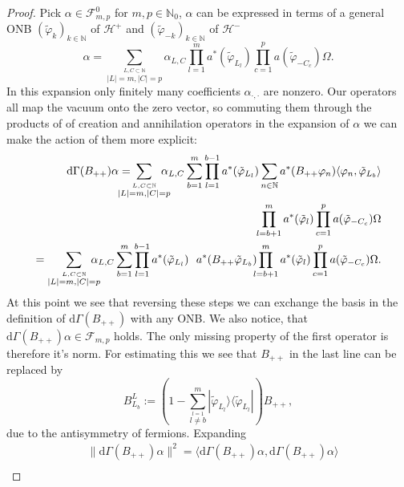 \documentclass[b5paper,draft,openbib,12pt]{memoir}
\begin{document}
\begin{proof}
Pick \(\alpha\in\mathcal{F}^0_{m,p}\) for \(m,p\in\mathbb{N}_0\), \(\alpha\) can be expressed in terms of a general ONB 
\((\tilde{\varphi}_k)_{k\in\mathbb{N}}\) of \(\mathcal{H}^+\) and \((\tilde{\varphi}_{-k})_{k\in\mathbb{N}}\) of \(\mathcal{H}^-\)
\begin{equation}
\alpha=\sum_{\overset{L,C\subset \mathbb{N}}{|L|=m,|C|=p}}\!\!\!\!\!\!\alpha_{L,C} \prod_{l=1}^m a^*(\tilde{\varphi}_{L_l}) \prod_{c=1}^p a(\tilde{\varphi}_{-C_c}) \Omega.
\end{equation}
In this expansion only finitely many coefficients \(\alpha_{\cdot, \cdot}\) are nonzero. Our operators all map the vacuum onto the zero vector, so commuting them 
through the products of of creation and annihilation operators in the expansion of \(\alpha\) we can make the action of them more explicit:
\begin{align}\nonumber
\mathrm{d}\Gamma(B_{++}) \alpha =\hspace{-0.5cm} \sum_{\overset{L,C\subset \mathbb{N}}{|L|=m,|C|=p}}\!\!\!\!\!\!\alpha_{L,C} \sum_{b=1}^m 
\prod_{l=1}^{b-1} a^*(\tilde{\varphi}_{L_l})  \sum_{n\in\mathbb{N}} a^*(B_{++}\varphi_n) \langle \varphi_n, \tilde{\varphi}_{L_b}\rangle \\
\prod_{l=b+1}^m a^*(\tilde{\varphi}_{l}) \prod_{c=1}^p a(\tilde{\varphi}_{-C_c}) \Omega\\
=\sum_{\overset{L,C\subset \mathbb{N}}{|L|=m,|C|=p}}\!\!\!\!\!\!\alpha_{L,C} \sum_{b=1}^m 
\prod_{l=1}^{b-1} a^*(\tilde{\varphi}_{L_l})  ~~ a^*(B_{++} \tilde{\varphi}_{L_b})  \!\!\!
\prod_{l=b+1}^m a^*(\tilde{\varphi}_{l}) \prod_{c=1}^p a(\tilde{\varphi}_{-C_c}) \Omega.
\end{align}
At this point we see that reversing these steps we can exchange the basis in the definition of \(\mathrm{d}\Gamma(B_{++})\) with any ONB.
We also notice, that \(\mathrm{d}\Gamma(B_{++})\alpha \in \mathcal{F}_{m,p}\) holds. The only missing property of the first operator is therefore
it's norm. For estimating this we see that \(B_{++}\) in the last line can be replaced by 
\begin{equation}
B^L_{L_b}:=\left(1-\sum_{\overset{l=1}{l\neq b}}^m |\tilde{\varphi}_{L_l}\rangle \langle \tilde{\varphi}_{L_l}|\right) B_{++},
\end{equation}
due to the antisymmetry of fermions. Expanding 
\begin{align}\nonumber
&\|\mathrm{d}\Gamma(B_{++})\alpha\|^2 = \langle \mathrm{d}\Gamma(B_{++})\alpha, \mathrm{d}\Gamma(B_{++})\alpha \rangle \\\nonumber

\end{align}
\end{proof}
\end{document}

